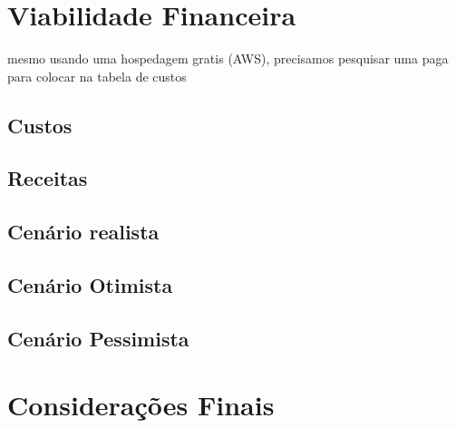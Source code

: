 \documentclass[
12pt,				%
openany,			%
oneside,			%
a4paper,			%
english,			%
french,				%
spanish,			%
brazil				%
]{abntex2}
\begin{document}
		
	
	
	
	
	
	
	
	\chapter{Viabilidade Financeira}
	
	mesmo usando uma hospedagem gratis (AWS), precisamos pesquisar uma paga para colocar na tabela de custos
	
	\section{Custos}
	
	\section{Receitas}
	\section{Cenário realista}
	\section{Cenário Otimista}
	\section{Cenário Pessimista}
	
	\chapter{Considerações Finais}



	
	\renewcommand{\bibname}{Referências Bibliográficas} %
	
	
	
	
\end{document}
